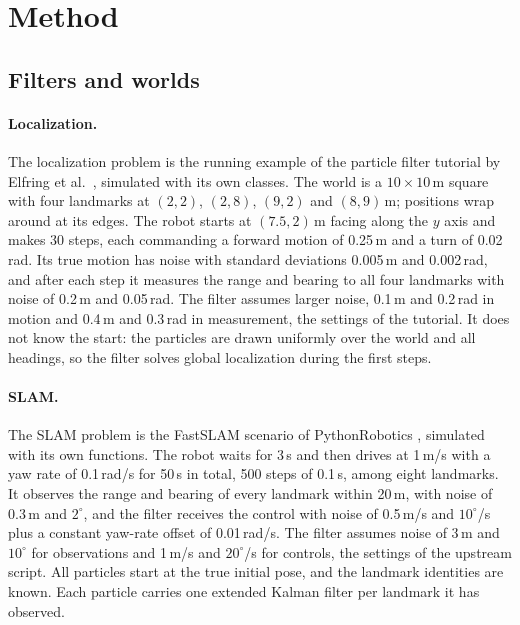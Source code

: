 \section{Method}\label{sec:method}

\subsection{Filters and worlds}

\paragraph{Localization.} The localization problem is the running example of the particle filter tutorial by Elfring
et al.\ \cite{elfring2021particle}, simulated with its own classes. The world is a $10 \times 10$\,m square with four
landmarks at $(2, 2)$, $(2, 8)$, $(9, 2)$ and $(8, 9)$\,m; positions wrap around at its edges. The robot starts at
$(7.5, 2)$\,m facing along the $y$ axis and makes 30 steps, each commanding a forward motion of 0.25\,m and a turn
of 0.02\,rad. Its true motion has noise with standard deviations 0.005\,m and 0.002\,rad, and after each step it
measures the range and bearing to all four landmarks with noise of 0.2\,m and 0.05\,rad. The filter assumes larger
noise, 0.1\,m and 0.2\,rad in motion and 0.4\,m and 0.3\,rad in measurement, the settings of the tutorial. It does
not know the start: the particles are drawn uniformly over the world and all headings, so the filter solves global
localization during the first steps.

\paragraph{SLAM.} The SLAM problem is the FastSLAM scenario of PythonRobotics \cite{sakai2018pythonrobotics},
simulated with its own functions. The robot waits for 3\,s and then drives at 1\,m/s with a yaw rate of 0.1\,rad/s for 50\,s in total, 500 steps of 0.1\,s,
among eight landmarks. It observes the range and bearing of every landmark within 20\,m, with noise of 0.3\,m and
$2^\circ$, and the filter receives the control with noise of 0.5\,m/s and $10^\circ$/s plus a constant yaw-rate
offset of 0.01\,rad/s. The filter assumes noise of 3\,m and $10^\circ$ for observations and 1\,m/s and $20^\circ$/s for
controls, the settings of the upstream script. All particles start at the true initial pose, and the landmark
identities are known. Each particle carries one extended Kalman filter per landmark it has observed.


